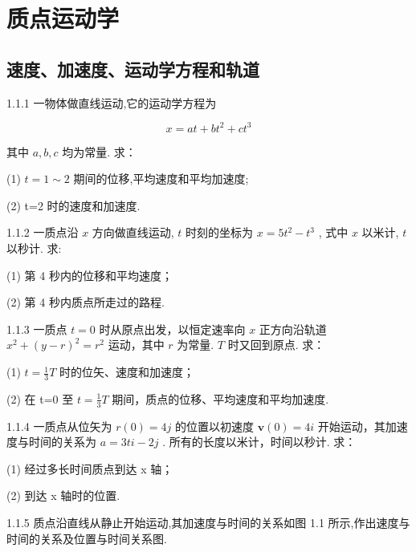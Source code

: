 \chapter{质点运动学}

\section{速度、加速度、运动学方程和轨道}

\begin{problem}{1.1.1}
一物体做直线运动,它的运动学方程为

\[
x = a t + b t ^ {2} + c t ^ {3}
\]

其中 $a, b, c$ 均为常量. 求：

(1) $t=1\sim2$ 期间的位移,平均速度和平均加速度;

(2) t=2 时的速度和加速度.
\end{problem}
\clearpage


\begin{problem}{1.1.2}
一质点沿 $x$ 方向做直线运动, $t$ 时刻的坐标为 $x = 5t^2 - t^3$ , 式中 $x$ 以米计, $t$ 以秒计. 求:

(1) 第 4 秒内的位移和平均速度；

(2) 第 4 秒内质点所走过的路程.
\end{problem}
\clearpage


\begin{problem}{1.1.3}
一质点 $t = 0$ 时从原点出发，以恒定速率向 $x$ 正方向沿轨道 $x^{2} + (y - r)^{2} = r^{2}$ 运动，其中 $r$ 为常量. $T$ 时又回到原点. 求：

(1) $t=\frac{1}{3}T$ 时的位矢、速度和加速度；

(2) 在 t=0 至 $t=\frac{1}{3}T$ 期间，质点的位移、平均速度和平均加速度.
\end{problem}
\clearpage


\begin{problem}{1.1.4}
一质点从位矢为 $r(0) = 4j$ 的位置以初速度 $\bm{v}(0) = 4i$ 开始运动，其加速度与时间的关系为 $a = 3ti - 2j$ . 所有的长度以米计，时间以秒计. 求：

(1) 经过多长时间质点到达 x 轴；

(2) 到达 x 轴时的位置.
\end{problem}
\clearpage


\begin{problem}{1.1.5}
质点沿直线从静止开始运动,其加速度与时间的关系如图 1.1 所示,作出速度与时间的关系及位置与时间关系图.
\begin{center}

\end{center}
\end{problem}
\clearpage


